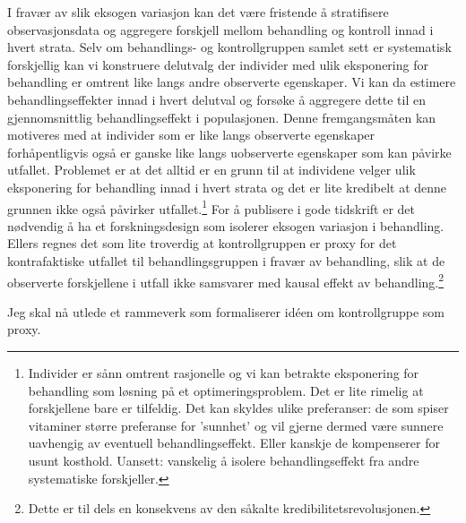 I fravær av slik eksogen variasjon kan det være fristende å stratifisere observasjonsdata og aggregere forskjell mellom behandling og kontroll innad i hvert strata. Selv om behandlings- og kontrollgruppen samlet sett er systematisk forskjellig kan vi konstruere delutvalg der individer med ulik eksponering for behandling er omtrent like langs andre observerte egenskaper. Vi kan da estimere behandlingseffekter innad i hvert delutval og forsøke å aggregere dette til en gjennomsnittlig behandlingseffekt i populasjonen. Denne fremgangsmåten kan motiveres med at individer som er like langs observerte egenskaper forhåpentligvis også er ganske like langs uobserverte egenskaper som kan påvirke utfallet. Problemet er at det alltid er en grunn til at individene velger ulik eksponering for behandling innad i hvert strata og det er lite kredibelt at denne grunnen ikke også påvirker utfallet.\footnote{Individer er sånn omtrent rasjonelle og vi kan betrakte eksponering for behandling som løsning på et optimeringsproblem. Det er lite rimelig at forskjellene bare er tilfeldig. Det kan skyldes ulike preferanser: de som spiser vitaminer større preferanse for 'sunnhet' og vil gjerne dermed være sunnere uavhengig av eventuell behandlingseffekt. Eller kanskje de kompenserer for usunt kosthold. Uansett: vanskelig å isolere behandlingseffekt fra andre systematiske forskjeller.} For å publisere i gode tidskrift er det nødvendig å ha et forskningsdesign som isolerer eksogen variasjon i behandling. Ellers regnes det som lite troverdig at kontrollgruppen er proxy for det kontrafaktiske utfallet til behandlingsgruppen i fravær av behandling, slik at de observerte forskjellene i utfall ikke samsvarer med kausal effekt av behandling.\footnote{Dette er til dels en konsekvens av den såkalte kredibilitetsrevolusjonen.}

Jeg skal nå utlede et rammeverk som formaliserer idéen om kontrollgruppe som proxy.
